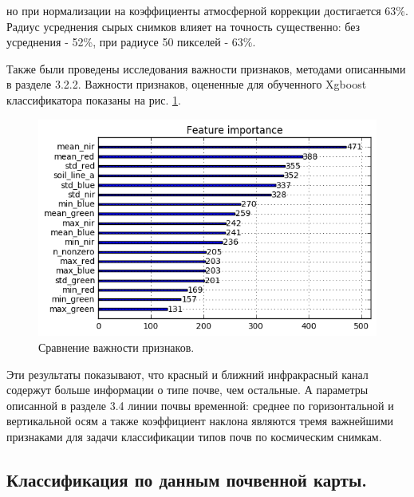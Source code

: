 \documentclass[14pt]{extarticle}
\begin{document}
но при нормализации на коэффициенты атмосферной коррекции достигается 63\%. Радиус усреднения
сырых снимков влияет на точность существенно: без усреднения - 52\%, 
при радиусе 50 пикселей - 63\%.
\par
Также были проведены исследования важности признаков, методами описанными в разделе 3.2.2.
Важности признаков, оцененные для обученного Xgboost классификатора показаны на рис. 
\ref{image:cuts_importance}.
\begin{figure}[H]
\centering
\includegraphics[width=\linewidth]{imgs/cuts_importance.png}
\caption{Сравнение важности признаков.}
\label{image:cuts_importance}
\end{figure}
Эти результаты показывают, что красный и ближний инфракрасный канал содержут больше информации
о типе почве, чем остальные. А параметры описанной в разделе 3.4 линии почвы временной:
среднее по горизонтальной и вертикальной осям а также коэффициент наклона являются тремя
важнейшими признаками для задачи классификации типов почв по космическим снимкам.

\subsection{Классификация по данным почвенной карты.}
\end{document}
